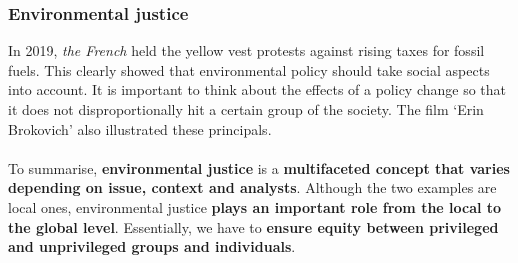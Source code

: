 \documentclass[../summary.tex]{subfiles}
\begin{document}
		\subsubsection{Environmental justice}
			In 2019, \emph{the French} held the yellow vest protests against rising taxes for fossil fuels. This clearly showed that environmental policy should take social aspects into account. It is important to think about the effects of a policy change so that it does not disproportionally hit a certain group of the society. The film `Erin Brokovich' also illustrated these principals.
			\\\\
			To summarise, \textbf{environmental justice} is a \textbf{multifaceted concept that varies depending on issue, context and analysts}. Although the two examples are local ones, environmental justice \textbf{plays an important role from the local to the global level}. Essentially, we have to \textbf{ensure equity between privileged and unprivileged groups and individuals}. 
		
		
\end{document}
